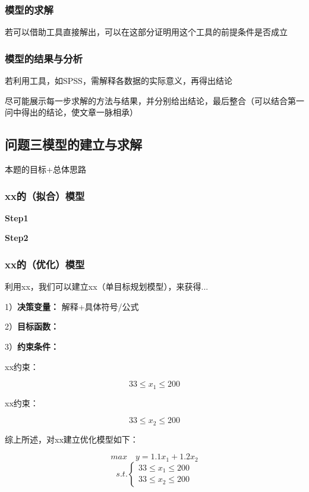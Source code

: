 \documentclass{ctexart}
\begin{document}
\subsubsection{模型的求解}
若可以借助工具直接解出，可以在这部分证明用这个工具的前提条件是否成立

\subsubsection{模型的结果与分析}
若利用工具，如SPSS，需解释各数据的实际意义，再得出结论

尽可能展示每一步求解的方法与结果，并分别给出结论，最后整合（可以结合第一问中得出的结论，使文章一脉相承）

\subsection{问题三模型的建立与求解}

本题的目标+总体思路

\subsubsection{xx的（拟合）模型}
\textbf{Step1 \quad }

\textbf{Step2 \quad }
\subsubsection{xx的（优化）模型}
利用xx，我们可以建立xx（单目标规划模型），来获得...

1）\textbf{决策变量：} 解释+具体符号/公式

2）\textbf{目标函数：}

3）\textbf{约束条件：}

 xx约束：

\begin{equation}
    33 \le x_1 \le 200
\end{equation}

 xx约束：

\begin{equation}
    33 \le x_2 \le 200
\end{equation}

综上所述，对xx建立优化模型如下：

\[
    max \quad y=1.1x_1+1.2x_2
\]
\begin{equation}
    s.t. \left\{
			      \begin{array}{ll}
                    33 \le x_1 \le 200\\
                    33 \le x_2 \le 200
				  \end{array}
		        \right.
\end{equation}
\end{document}
